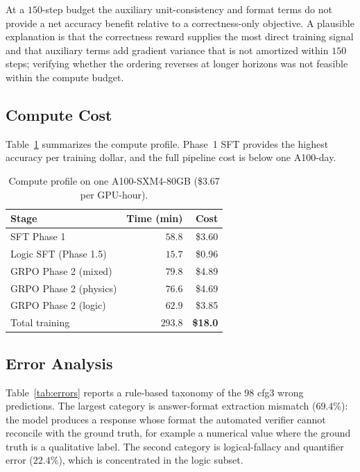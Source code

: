 \documentclass[preprint,12pt]{elsarticle}
\begin{document}
At a $150$-step budget the auxiliary unit-consistency and format terms do not
provide a net accuracy benefit relative to a correctness-only objective. A
plausible explanation is that the correctness reward supplies the most direct
training signal and that auxiliary terms add gradient variance that is not
amortized within $150$ steps; verifying whether the ordering reverses at
longer horizons was not feasible within the compute budget.

\subsection{Compute Cost}
Table~\ref{tab:compute} summarizes the compute profile. Phase~1 SFT provides
the highest accuracy per training dollar, and the full pipeline cost is below
one A100-day.

\begin{table}[t]
\centering
\caption{Compute profile on one A100-SXM4-80GB (\$3.67 per GPU-hour).}
\label{tab:compute}
\begin{tabular}{lrr}
\toprule
Stage & Time (min) & Cost \\
\midrule
SFT Phase 1            & $58.8$  & \$3.60 \\
Logic SFT (Phase 1.5)  & $15.7$  & \$0.96 \\
GRPO Phase 2 (mixed)   & $79.8$  & \$4.89 \\
GRPO Phase 2 (physics) & $76.6$  & \$4.69 \\
GRPO Phase 2 (logic)   & $62.9$  & \$3.85 \\
\midrule
Total training         & $293.8$ & \textbf{\$18.0} \\
\bottomrule
\end{tabular}
\end{table}

\subsection{Error Analysis}
\label{sec:error}
Table~\ref{tab:errors} reports a rule-based taxonomy of the $98$ cfg3 wrong
predictions. The largest category is answer-format extraction mismatch
($69.4\%$): the model produces a response whose format the automated verifier
cannot reconcile with the ground truth, for example a numerical value where
the ground truth is a qualitative label. The second category is
logical-fallacy and quantifier error ($22.4\%$), which is concentrated in the
logic subset.
\end{document}
